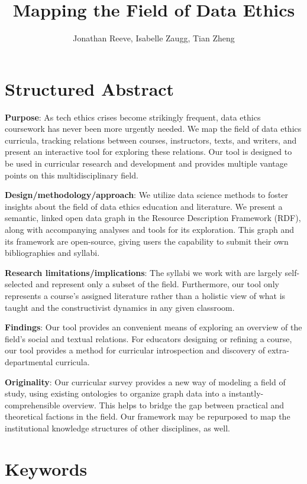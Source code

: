 \documentclass[
]{article}
\title{Mapping the Field of Data Ethics}
\author{Jonathan Reeve, Isabelle Zaugg, Tian Zheng}
\date{}
\begin{document}
\maketitle

\hypertarget{structured-abstract}{%
\section{Structured Abstract}\label{structured-abstract}}

\textbf{Purpose}: As tech ethics crises become strikingly frequent, data
ethics coursework has never been more urgently needed. We map the field
of data ethics curricula, tracking relations between courses,
instructors, texts, and writers, and present an interactive tool for
exploring these relations. Our tool is designed to be used in curricular
research and development and provides multiple vantage points on this
multidisciplinary field.

\textbf{Design/methodology/approach}: We utilize data science methods to
foster insights about the field of data ethics education and literature.
We present a semantic, linked open data graph in the Resource
Description Framework (RDF), along with accompanying analyses and tools
for its exploration. This graph and its framework are open-source,
giving users the capability to submit their own bibliographies and
syllabi.

\textbf{Research limitations/implications}: The syllabi we work with are
largely self-selected and represent only a subset of the field.
Furthermore, our tool only represents a course's assigned literature
rather than a holistic view of what is taught and the constructivist
dynamics in any given classroom.

\textbf{Findings}: Our tool provides an convenient means of exploring an
overview of the field's social and textual relations. For educators
designing or refining a course, our tool provides a method for
curricular introspection and discovery of extra-departmental curricula.

\textbf{Originality}: Our curricular survey provides a new way of
modeling a field of study, using existing ontologies to organize graph
data into a instantly-comprehensible overview. This helps to bridge the
gap between practical and theoretical factions in the field. Our
framework may be repurposed to map the institutional knowledge
structures of other disciplines, as well.

\hypertarget{keywords}{%
\section{Keywords}\label{keywords}}
\end{document}
